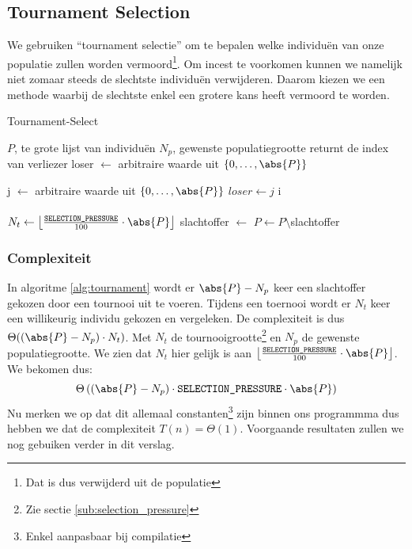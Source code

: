 \subsection{Tournament Selection}
\label{sub:tournament}
We gebruiken ``tournament selectie'' om te bepalen welke individuën van onze populatie 
zullen worden vermoord\footnote{Dat is dus verwijderd uit de populatie}. Om incest te 
voorkomen kunnen we namelijk niet zomaar steeds de slechtste individuën verwijderen. Daarom kiezen we een methode waarbij de slechtste enkel een grotere kans heeft vermoord te worden.
	\begin{algorithm}[H]
	 	\caption{Tournament-Select}
		\begin{algorithmic}
		\Require 
			\State $P$, te grote lijst van individuën 
			\State $N_p$, gewenste populatiegrootte
		\Ensure returnt de index van verliezer
		\State loser $\gets$ arbitraire waarde uit $\lbrace 0, \dots, \abs{P} \rbrace$

		\State j $\gets$ arbitraire waarde uit $\lbrace 0, \dots, \abs{P} \rbrace$
			\State $loser \gets j$
		\EndIf
		\EndFor		
		\State \Return i
		\EndFunction
		\\
		\\
			\State $N_t \gets \left\lfloor\frac{\texttt{SELECTION\_PRESSURE}}{100} \cdot \abs{P}\right\rfloor$ 
			\State slachtoffer $\gets$ 
			\State $P \gets P\setminus$slachtoffer
		\EndWhile
		
		\end{algorithmic}
		\label{alg:tournament}
	\end{algorithm}		
\subsubsection{Complexiteit}
In algoritme \ref{alg:tournament} wordt er $\abs{P}-N_p$ keer een slachtoffer gekozen door een tournooi uit te voeren. Tijdens een toernooi wordt er $N_t$ keer een willikeurig individu gekozen en vergeleken. De complexiteit is dus $\Theta((\abs{P}-N_p)\cdot N_t)$. Met $N_t$ de tournooigrootte\footnote{Zie sectie \ref{sub:selection_pressure}} en $N_p$ de gewenste populatiegrootte. We zien dat $N_t$ hier gelijk is aan
 $\left\lfloor\frac{\texttt{SELECTION\_PRESSURE}}{100} \cdot \abs{P}\right\rfloor$.
 We bekomen dus: \[\Theta\left(\left(\abs{P}-N_p\right)\cdot \texttt{SELECTION\_PRESSURE} \cdot \abs{P}\right)\]
 Nu merken we op dat dit allemaal constanten\footnote{Enkel aanpasbaar bij compilatie} zijn binnen ons programmma dus hebben we dat de complexiteit $T(n) = \Theta(1)$. Voorgaande resultaten zullen we nog gebuiken verder in dit verslag. %

